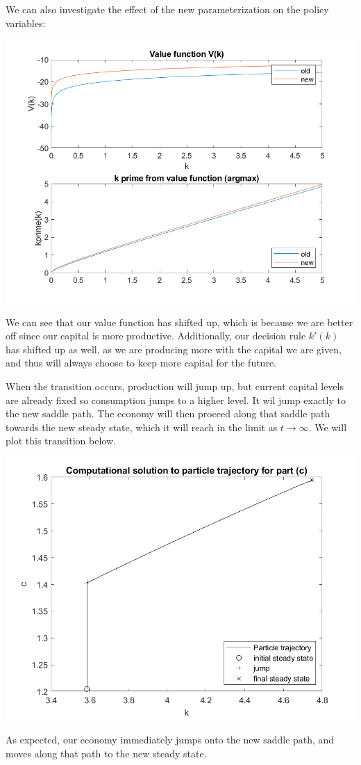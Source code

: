 \documentclass[11pt]{article} %
\begin{document}
We can also investigate the effect of the new parameterization on the policy variables:

\includegraphics{partC2}

We can see that our value function has shifted up, which is because we are better off since our capital is more productive. Additionally, our decision rule $k'(k)$ has shifted up as well, as we are producing more with the capital we are given, and thus will always choose to keep more capital for the future.

When the transition occurs, production will jump up, but current capital levels are already fixed so consumption jumps to a higher level. It wil jump exactly to the new saddle path. The economy will then proceed along that saddle path towards the new steady state, which it will reach in the limit as $t\rightarrow \infty$. We will plot this transition below.

\includegraphics{traj}

As expected, our economy immediately jumps onto the new saddle path, and moves along that path to the new steady state.
\end{document}
